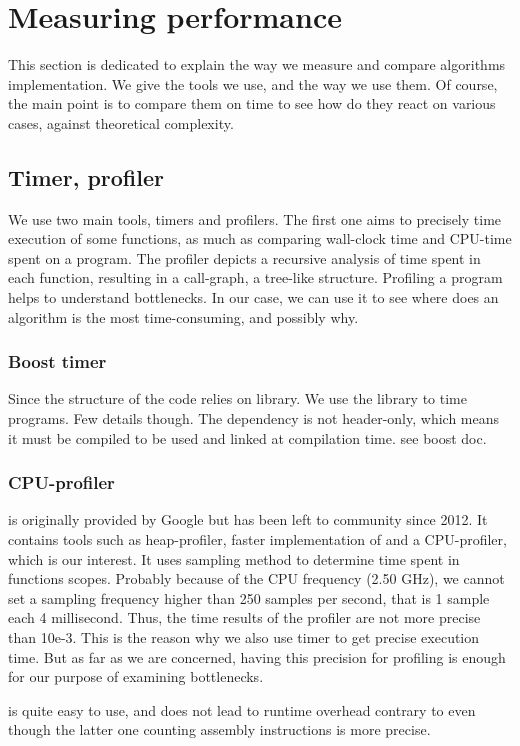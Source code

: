 \section{Measuring performance}

This section is dedicated to explain the way we measure and compare algorithms
implementation. We give the tools we use, and the way we use them. Of course,
the main point is to compare them on time to see how do they react on various 
cases, against theoretical complexity. 

\subsection{Timer, profiler}

We use two main tools, timers and profilers. The first one aims to precisely 
time execution of some functions, as much as comparing wall-clock time and 
CPU-time spent on a program. The profiler depicts a recursive analysis of time
spent in each function, resulting in a call-graph, a tree-like structure. 
Profiling a program helps to understand bottlenecks. In our case, we can use it
to see where does an algorithm is the most time-consuming, and possibly why.

\subsubsection{Boost timer}

Since the structure of the code relies on  library. We use the 
 library to time programs. Few details though. The 
 dependency is not header-only, which means it must be compiled
to be used and linked at compilation time. see boost doc. 

\subsubsection{ CPU-profiler}

 is originally provided by Google but has been left to 
community since 2012. It contains tools such as heap-profiler, faster 
implementation of  and a CPU-profiler, which is our interest. It
uses sampling method to determine time spent in functions scopes. Probably 
because of the CPU frequency (2.50 GHz), we cannot set a sampling frequency
higher than 250 samples per second, that is 1 sample each 4 millisecond. Thus,
the time results of the profiler are not more precise than 10e-3. This is the
reason why we also use timer to get precise execution time. But as far as we
are concerned, having this precision for profiling is enough for our purpose 
of examining bottlenecks. 

 is quite easy to use, and does not lead to runtime overhead
contrary to  even though the latter one counting 
assembly instructions is more precise.